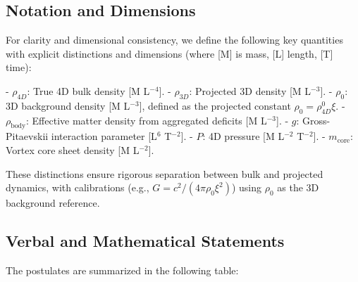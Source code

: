 \documentclass{article}
\begin{document}
\subsection{Notation and Dimensions}

For clarity and dimensional consistency, we define the following key quantities with explicit distinctions and dimensions (where [M] is mass, [L] length, [T] time):

- $\rho_{4D}$: True 4D bulk density [M L$^{-4}$].
- $\rho_{3D}$: Projected 3D density [M L$^{-3}$].
- $\rho_0$: 3D background density [M L$^{-3}$], defined as the projected constant $\rho_0 = \rho_{4D}^0 \xi$.
- $\rho_{\text{body}}$: Effective matter density from aggregated deficits [M L$^{-3}$].
- $g$: Gross-Pitaevskii interaction parameter [L$^6$ T$^{-2}$].
- $P$: 4D pressure [M L$^{-2}$ T$^{-2}$].
- $m_{\text{core}}$: Vortex core sheet density [M L$^{-2}$].

These distinctions ensure rigorous separation between bulk and projected dynamics, with calibrations (e.g., $G = c^2 / (4\pi \rho_0 \xi^2)$) using $\rho_0$ as the 3D background reference.

\subsection{Verbal and Mathematical Statements}

The postulates are summarized in the following table:
\end{document}
